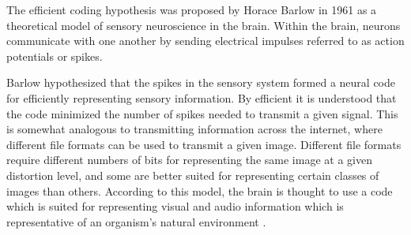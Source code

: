 \documentclass[a4paper]{article}
\title{}
\date{}
\begin{document}
    \maketitle
    The efficient coding hypothesis was proposed by Horace Barlow in 1961 as a theoretical model of sensory neuroscience in the brain. Within the brain, neurons communicate with one another by sending electrical impulses referred to as action potentials or spikes.
    
    Barlow hypothesized that the spikes in the sensory system formed a neural code for efficiently representing sensory information. By efficient it is understood that the code minimized the number of spikes needed to transmit a given signal. This is somewhat analogous to transmitting information across the internet, where different file formats can be used to transmit a given image. Different file formats require different numbers of bits for representing the same image at a given distortion level, and some are better suited for representing certain classes of images than others. According to this model, the brain is thought to use a code which is suited for representing visual and audio information which is representative of an organism's natural environment .
    
    
\end{document}
